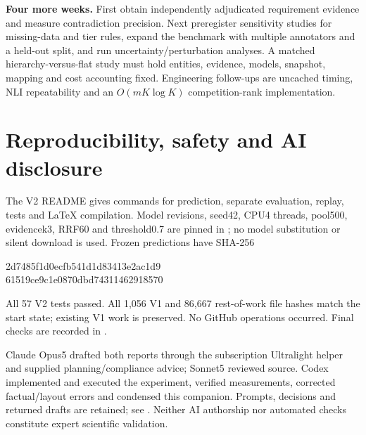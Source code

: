 \documentclass[11pt,a4paper]{article}
\begin{document}
\textbf{Four more weeks.} First obtain independently adjudicated requirement evidence and measure contradiction precision. Next preregister sensitivity studies for missing-data and tier rules, expand the benchmark with multiple annotators and a held-out split, and run uncertainty/perturbation analyses. A matched hierarchy-versus-flat study must hold entities, evidence, models, snapshot, mapping and cost accounting fixed. Engineering follow-ups are uncached timing, NLI repeatability and an $O(mK\log K)$ competition-rank implementation.

\section*{Reproducibility, safety and AI disclosure}
The V2 README gives commands for prediction, separate evaluation, replay, tests and LaTeX compilation. Model revisions, seed42, CPU4 threads, pool500, evidencek3, RRF60 and threshold0.7 are pinned in ; no model substitution or silent download is used. Frozen predictions have SHA-256
\begin{center}\small\ttfamily
2d7485f1d0ecfb541d1d83413e2ac1d9\\
61519ce9c1e0870dbd74311462918570
\end{center}
All 57 V2 tests passed. All 1,056 V1 and 86,667 rest-of-work file hashes match the start state; existing V1 work is preserved. No GitHub operations occurred. Final checks are recorded in .

Claude Opus5 drafted both reports through the subscription Ultralight helper and supplied planning/compliance advice; Sonnet5 reviewed source. Codex implemented and executed the experiment, verified measurements, corrected factual/layout errors and condensed this companion. Prompts, decisions and returned drafts are retained; see . Neither AI authorship nor automated checks constitute expert scientific validation.
\end{document}
